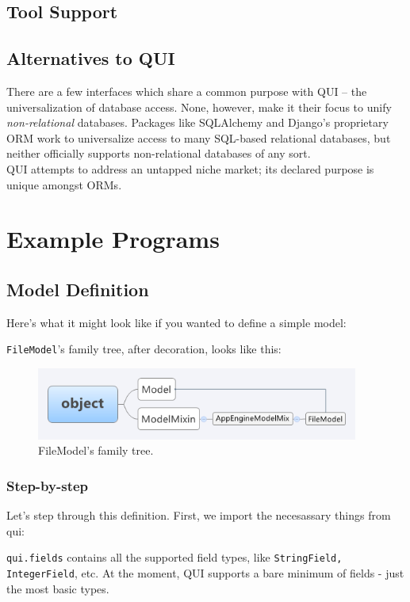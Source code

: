 \documentclass{article} %
\newenvironment{inset}
{
\begin{center}
\begin{minipage}{0.85\textwidth}
}
{
\end{minipage}
\end{center}
}
\newcommand{\il}[1]{\lstinline{#1}}
\newcommand{\lstslice}[3]{
\begin{inset}

\end{inset}
}
\begin{document}
\subsection{Tool Support}


\subsection{Alternatives to QUI}
There are a few interfaces which share a common purpose with QUI -- the universalization of database access. None, however,
make it their focus to unify \emph{non-relational} databases. Packages like SQLAlchemy and Django's proprietary ORM work to
universalize access to many SQL-based relational databases, but neither officially supports non-relational databases of any sort.\\

QUI attempts to address an untapped niche market; its declared purpose is unique amongst ORMs.

\section{Example Programs}
\subsection{Model Definition}
Here's what it might look like if you wanted to define a simple model:

\il{FileModel}'s family tree, after decoration, looks like this:
\begin{figure}[htb]
\centering
\includegraphics[width=400px]{FileModelInheritanceTree}
\caption{FileModel's family tree.}
\end{figure}

\subsubsection{Step-by-step}
Let's step through this definition. First, we import the necesassary things from qui:
\lstslice{1}{4}{model_definitions.py}
\il{qui.fields} contains all the supported field types, like \il{StringField, IntegerField}, etc. At the moment, QUI supports 
a bare minimum of fields - just the most basic types.
\end{document}
